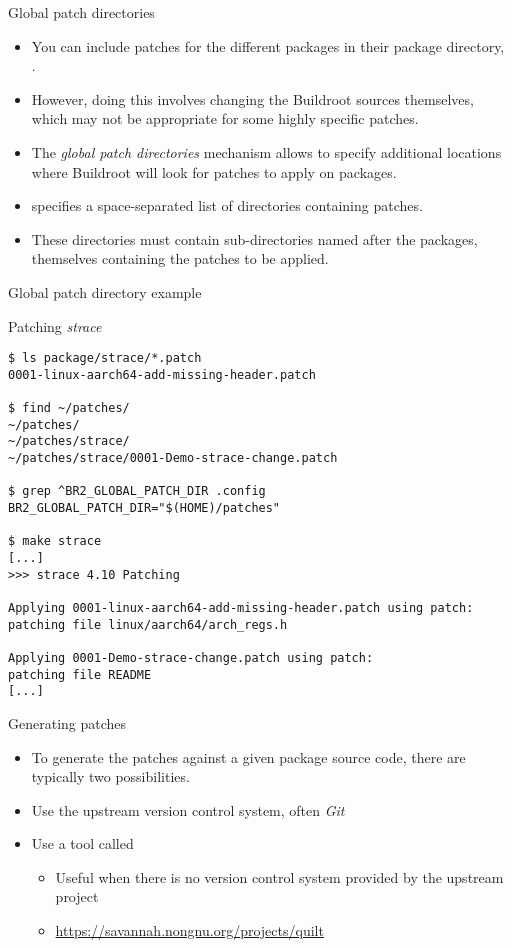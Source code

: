 \begin{frame}{Global patch directories}
  \begin{itemize}
  \item You can include patches for the different packages in their
    package directory, .
  \item However, doing this involves changing the Buildroot sources
    themselves, which may not be appropriate for some highly specific
    patches.
  \item The {\em global patch directories} mechanism allows to specify
    additional locations where Buildroot will look for patches to
    apply on packages.
  \item {} specifies a space-separated list
    of directories containing patches.
  \item These directories must contain sub-directories named after the
    packages, themselves containing the patches to be applied.
  \end{itemize}
\end{frame}

\begin{frame}[fragile]{Global patch directory example}

\begin{block}{Patching {\em strace}}
{\tiny
\begin{verbatim}
$ ls package/strace/*.patch
0001-linux-aarch64-add-missing-header.patch

$ find ~/patches/
~/patches/
~/patches/strace/
~/patches/strace/0001-Demo-strace-change.patch

$ grep ^BR2_GLOBAL_PATCH_DIR .config
BR2_GLOBAL_PATCH_DIR="$(HOME)/patches"

$ make strace
[...]
>>> strace 4.10 Patching

Applying 0001-linux-aarch64-add-missing-header.patch using patch: 
patching file linux/aarch64/arch_regs.h

Applying 0001-Demo-strace-change.patch using patch: 
patching file README
[...]
\end{verbatim}}
\end{block}

\end{frame}

\begin{frame}{Generating patches}
  \begin{itemize}
  \item To generate the patches against a given package source code,
    there are typically two possibilities.
  \item Use the upstream version control system, often {\em Git}
  \item Use a tool called 
    \begin{itemize}
    \item Useful when there is no version control system provided by
      the upstream project
    \item \url{https://savannah.nongnu.org/projects/quilt}
    \end{itemize}
  \end{itemize}
\end{frame}

